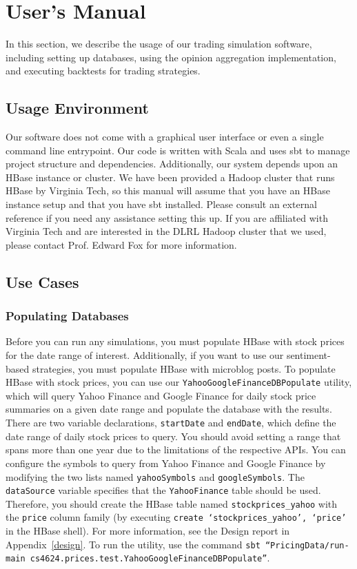 \section{User's Manual}

In this section, we describe the usage of our trading simulation software, including setting up databases, using the opinion aggregation implementation, and executing backtests for trading strategies.

\subsection{Usage Environment}

Our software does not come with a graphical user interface or even a single command line entrypoint.
Our code is written with Scala \cite{scala} and uses sbt \cite{sbt} to manage project structure and dependencies.
Additionally, our system depends upon an HBase \cite{hbase} instance or cluster.
We have been provided a Hadoop cluster that runs HBase by Virginia Tech, so this manual will assume that you have an HBase instance setup and that you have sbt installed.
Please consult an external reference if you need any assistance setting this up.
If you are affiliated with Virginia Tech and are interested in the DLRL Hadoop cluster that we used, please contact Prof. Edward Fox for more information.

\subsection{Use Cases}

\subsubsection{Populating Databases}

Before you can run any simulations, you must populate HBase with stock prices for the date range of interest.
Additionally, if you want to use our sentiment-based strategies, you must populate HBase with microblog posts.
To populate HBase with stock prices, you can use our \texttt{YahooGoogleFinance\-DBPopulate} utility, which will query Yahoo Finance and Google Finance for daily stock price summaries on a given date range and populate the database with the results.
There are two variable declarations, \texttt{startDate} and \texttt{endDate}, which define the date range of daily stock prices to query.
You should avoid setting a range that spans more than one year due to the limitations of the respective APIs.
You can configure the symbols to query from Yahoo Finance and Google Finance by modifying the two lists named \texttt{yahooSymbols} and \texttt{googleSymbols}.
The \texttt{dataSource} variable specifies that the \texttt{YahooFinance} table should be used.
Therefore, you should create the HBase table named \texttt{stockprices\_yahoo} with the \texttt{price} column family (by executing \texttt{create `stockprices\_yahoo', `price'} in the HBase shell).
For more information, see the Design report in Appendix~\ref{design}.
To run the utility, use the command \texttt{sbt ``PricingData/run-main\\ cs4624.prices.test.YahooGoogleFinanceDBPopulate''}.

